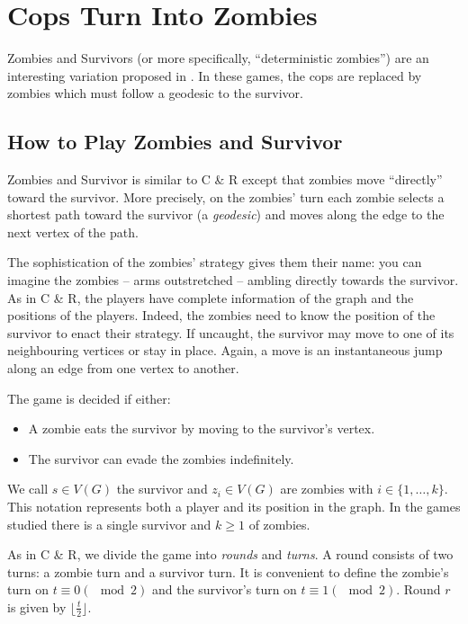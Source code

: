 
\section{Cops Turn Into Zombies}

Zombies and Survivors (or more specifically, ``deterministic zombies'') are an interesting variation proposed in \cite{fitzpatrick2016deterministic}. In these games, the
cops are replaced by zombies which must follow a geodesic to the survivor.

\subsection{How to Play Zombies and Survivor}

Zombies and Survivor is similar to C \& R except that zombies move
``directly'' toward the survivor. More precisely, on the zombies' turn
each zombie selects a shortest path toward the survivor (a \textit{geodesic})
and moves along the edge to the next vertex of the path.

The sophistication of the zombies' strategy gives them their name:
you can imagine the zombies -- arms outstretched -- ambling directly towards the survivor.
As in C \& R, the players have complete information of the graph and the positions of the players. Indeed, the zombies need to know the position of the survivor to enact
their strategy. If uncaught, the survivor may move to one of its neighbouring vertices or stay in place. Again, a move is an instantaneous jump along an edge from one vertex to another.

The game is decided if either:
\begin{itemize}
\item A zombie eats the survivor by moving to the survivor's vertex.
\item The survivor can evade the zombies indefinitely.
\end{itemize}

We call $s \in V(G)$ the survivor and $z_i \in V(G)$ are zombies with $i \in \{1, \dots, k\}$.
This notation represents both a player and its position in the graph.
In the games studied there is a single survivor and $k \geq 1$ of zombies.

As in C \& R, we divide the game into \textit{rounds} and \textit{turns}. A round consists of two turns: a zombie turn and a survivor turn.
It is convenient to define the zombie's turn on $t \equiv 0 (\mod{2})$ and the survivor's turn on $t \equiv 1 (\mod{2})$.
Round $r$ is given by $\lfloor \frac{t}{2} \rfloor$.

